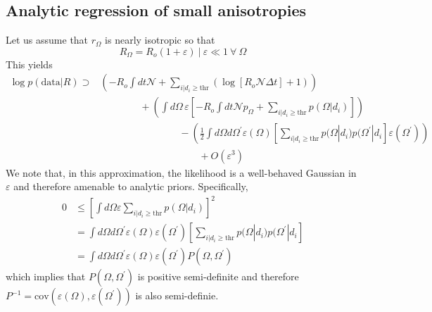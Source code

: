 \documentclass{article}
\begin{document}

\subsection*{Analytic regression of small anisotropies}

Let us assume that $r_\Omega$ is nearly isotropic so that 
\begin{equation}
    \left. R_\Omega = R_o\left(1+\varepsilon\right) \ \right| \ \varepsilon \ll 1 \ \forall \ \Omega
\end{equation}
This yields
\begin{align}
    \log p(\mathrm{data}|R) \supset & \left( - R_o \int dt \mathcal{N} + \sum\limits_{i|d_i\geq\mathrm{thr}} \left( \log\left[ R_o \mathcal{N} \Delta t \right] + 1 \right) \right) \nonumber \\
                                    & \quad \quad \quad \quad + \left( \int d\Omega\, \varepsilon \left[ - R_o \int dt \mathcal{N} p_\Omega + \sum\limits_{i|d_i\geq\mathrm{thr}} p(\Omega|d_i) \right] \right) \nonumber \\
                                    & \quad \quad \quad \quad \quad \quad \quad \quad - \left( \frac{1}{2}\int d\Omega d\Omega^\prime \varepsilon(\Omega) \left[ \sum\limits_{i|d_i\geq\mathrm{thr}} p(\Omega|d_i) p(\Omega^\prime|d_i \right] \varepsilon(\Omega^\prime) \right) \nonumber \\
                                    & \quad \quad \quad \quad \quad \quad \quad \quad \quad \quad + O\left(\varepsilon^3\right)
\end{align}
We note that, in this approximation, the likelihood is a well-behaved Gaussian in $\varepsilon$ and therefore amenable to analytic priors.
Specifically,
\begin{align}
    0 & \leq \left[\int d\Omega \varepsilon \sum\limits_{i|d_i\geq\mathrm{thr}} p(\Omega|d_i)\right]^2 \nonumber \\
      & = \int d\Omega d\Omega^\prime \varepsilon(\Omega) \varepsilon(\Omega^\prime) \left[ \sum\limits_{i|d_i\geq\mathrm{thr}} p(\Omega|d_i) p(\Omega^\prime|d_i \right] \\
      & = \int d\Omega d\Omega^\prime \varepsilon(\Omega) \varepsilon(\Omega^\prime) P(\Omega, \Omega^\prime)
\end{align}
which implies that $P(\Omega, \Omega^\prime)$ is positive semi-definite and therefore $P^{-1} = \mathrm{cov}\left(\varepsilon(\Omega), \varepsilon(\Omega^\prime)\right)$ is also semi-definie.
\end{document}
